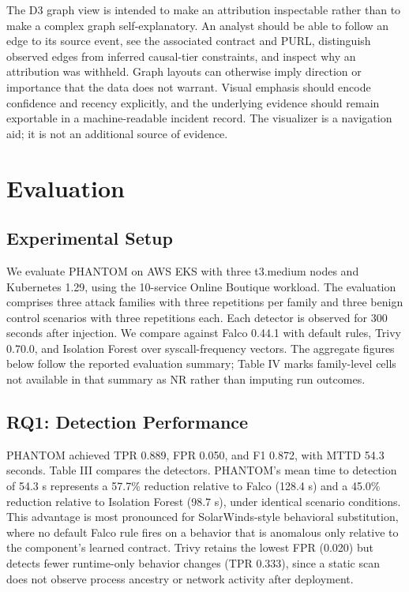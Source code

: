 \documentclass[conference]{IEEEtran}
\begin{document}
The D3 graph view is intended to make an attribution inspectable rather than to make a complex graph self-explanatory. An analyst should be able to follow an edge to its source event, see the associated contract and PURL, distinguish observed edges from inferred causal-tier constraints, and inspect why an attribution was withheld. Graph layouts can otherwise imply direction or importance that the data does not warrant. Visual emphasis should encode confidence and recency explicitly, and the underlying evidence should remain exportable in a machine-readable incident record. The visualizer is a navigation aid; it is not an additional source of evidence.

\section{Evaluation}
\subsection{Experimental Setup}
We evaluate PHANTOM on AWS EKS with three t3.medium nodes and Kubernetes 1.29, using the 10-service Online Boutique workload. The evaluation comprises three attack families with three repetitions per family and three benign control scenarios with three repetitions each. Each detector is observed for 300 seconds after injection. We compare against Falco 0.44.1 with default rules, Trivy 0.70.0, and Isolation Forest over syscall-frequency vectors. The aggregate figures below follow the reported evaluation summary; Table IV marks family-level cells not available in that summary as NR rather than imputing run outcomes.

\subsection{RQ1: Detection Performance}
PHANTOM achieved TPR 0.889, FPR 0.050, and F1 0.872, with MTTD 54.3 seconds. Table III compares the detectors. PHANTOM's mean time to detection of 54.3 s represents a 57.7\% reduction relative to Falco (128.4 s) and a 45.0\% reduction relative to Isolation Forest (98.7 s), under identical scenario conditions. This advantage is most pronounced for SolarWinds-style behavioral substitution, where no default Falco rule fires on a behavior that is anomalous only relative to the component's learned contract. Trivy retains the lowest FPR (0.020) but detects fewer runtime-only behavior changes (TPR 0.333), since a static scan does not observe process ancestry or network activity after deployment.
\end{document}
